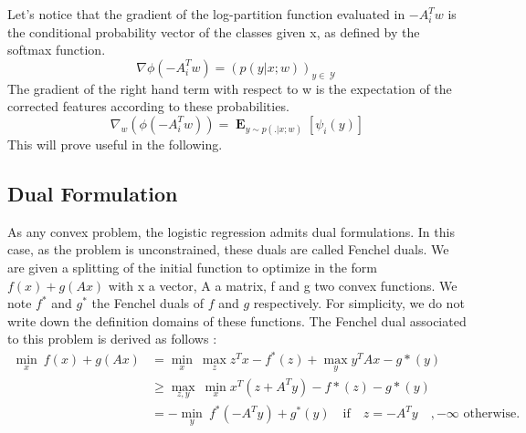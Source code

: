 \documentclass{article}
\DeclareMathOperator{\1}{\mathbb{1}}
\DeclareMathOperator{\E}{\mathbf{E}}
\DeclareMathOperator{\Y}{\mathcal{Y}}
\begin{document}
Let's notice that the gradient of the log-partition function evaluated in $-A_i^Tw$ is the conditional probability vector of the classes given x, as defined by the softmax function.
\begin{equation}
	\nabla \phi(-A_i^Tw) = (p(y | x ; w))_{y \in \Y}
\end{equation}
The gradient of the right hand term with respect to w is the expectation of the corrected features according to these probabilities.
\begin{equation}
	\nabla_w (\phi(-A_i^Tw)) = \E_{y \sim p(. | x ; w)} [\psi_i(y)]
\end{equation}
This will prove useful in the following.



\subsection{Dual Formulation}

As any convex problem, the logistic regression admits dual formulations.
In this case, as the problem is unconstrained, these duals are called Fenchel duals.
We are given a splitting of the initial function to optimize in the form $f(x) + g(Ax)$ with x a vector, A a matrix, f and g two convex functions.
We note $f^*$ and $g^*$ the Fenchel duals of $f$ and $g$ respectively.
For simplicity, we do not write down the definition domains of these functions.
The Fenchel dual associated to this problem is derived as follows :
\begin{align*}
	 \min_x \ f(x) + g(Ax) & = \min_x \ \max_z z^Tx - f^*(z) + \max_y y^T A x - g*(y) \\
	 	& \geq \max_{z, y} \  \min_x x^T(z + A^T y) - f*(z) - g*(y) \\
		& =  - \min_y \   f^*(-A^Ty) + g^*(y) \quad \textrm{if} \quad z=-A^T y \quad , -\infty \textrm{ otherwise.}\\
\end{align*}
\end{document}
